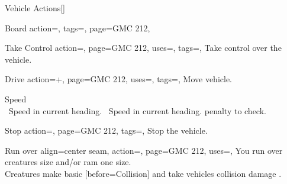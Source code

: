 \begin{PageBack}
\begin{Tables}{\backTableHeight}
\begin{Table}{Vehicle Actions}[]
\begin{entry}{Board}{%
                action=,
                tags=\Move,
                page=GMC 212,
            }
            \end{entry}
            \begin{entry}{Take Control}{%
                action=,
                page=GMC 212,
                uses=\Piloting,
                tags=\Manipulate,
            }
                Take control over the vehicle. \hfill{} \hfill {}
            \end{entry}
            \begin{entry}{Drive}{%
                action=+,
                page=GMC 212,
                uses=\Piloting,
                tags=\Move,
            }
                Move vehicle.\hfill
                \begin{minipage}[c]{0.78\linewidth}
                     Speed \quad{} \quad {}\quad {} \\
                    \Reck\, Speed in current heading.\hfill
                    \Reck\, Speed in current heading.  penalty to check.
                \end{minipage}
            \end{entry}
            \begin{entry}{Stop}{%
                action=,
                page=GMC 212,
                tags=\Manipulate,
            }
                Stop the vehicle.
            \end{entry}
            \begin{entry}{Run over}{%
                align=center seam,
                action=,
                page=GMC 212,
                uses={\Piloting[tags=R]},
            }
                You run over creatures  size and/or ram one  size. \hfill {}\\
                Creatures make basic [before=Collision] and take vehicles
                collision damage
                . \hfill{}
            \end{entry}
        \end{Table}
    \end{Tables}%
    \begin{Tables}{\backTableHeight}%

\end{Tables}
\end{PageBack}
